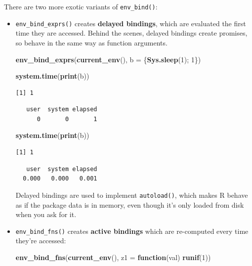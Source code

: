 \documentclass[]{book}
\newenvironment{Shaded}{\begin{snugshade}}{\end{snugshade}}
\newcommand{\ControlFlowTok}[1]{\textcolor[rgb]{0.13,0.29,0.53}{\textbf{#1}}}
\newcommand{\DataTypeTok}[1]{\textcolor[rgb]{0.13,0.29,0.53}{#1}}
\newcommand{\DecValTok}[1]{\textcolor[rgb]{0.00,0.00,0.81}{#1}}
\newcommand{\KeywordTok}[1]{\textcolor[rgb]{0.13,0.29,0.53}{\textbf{#1}}}
\newcommand{\NormalTok}[1]{#1}
\theoremstyle{definition}
\theoremstyle{definition}
\theoremstyle{definition}
\theoremstyle{remark}
\begin{document}
There are two more exotic variants of \texttt{env\_bind()}:

\begin{itemize}
\item
  \texttt{env\_bind\_exprs()} creates \textbf{delayed bindings}, which
  are evaluated the first time they are accessed. Behind the scenes,
  delayed bindings create promises, so behave in the same way as
  function arguments.

\begin{Shaded}
\begin{Highlighting}[]
\KeywordTok{env_bind_exprs}\NormalTok{(}\KeywordTok{current_env}\NormalTok{(), }\DataTypeTok{b =}\NormalTok{ \{}\KeywordTok{Sys.sleep}\NormalTok{(}\DecValTok{1}\NormalTok{); }\DecValTok{1}\NormalTok{\})}

\KeywordTok{system.time}\NormalTok{(}\KeywordTok{print}\NormalTok{(b))}
\end{Highlighting}
\end{Shaded}

\begin{verbatim}
[1] 1
\end{verbatim}

\begin{verbatim}
   user  system elapsed 
      0       0       1 
\end{verbatim}

\begin{Shaded}
\begin{Highlighting}[]
\KeywordTok{system.time}\NormalTok{(}\KeywordTok{print}\NormalTok{(b))}
\end{Highlighting}
\end{Shaded}

\begin{verbatim}
[1] 1
\end{verbatim}

\begin{verbatim}
   user  system elapsed 
  0.000   0.000   0.001 
\end{verbatim}

  Delayed bindings are used to implement \texttt{autoload()}, which
  makes R behave as if the package data is in memory, even though it's
  only loaded from disk when you ask for it.
\item
  \texttt{env\_bind\_fns()} creates \textbf{active bindings} which are
  re-computed every time they're accessed:

\begin{Shaded}
\begin{Highlighting}[]
\KeywordTok{env_bind_fns}\NormalTok{(}\KeywordTok{current_env}\NormalTok{(), }\DataTypeTok{z1 =} \ControlFlowTok{function}\NormalTok{(val) }\KeywordTok{runif}\NormalTok{(}\DecValTok{1}\NormalTok{))}


\end{Highlighting}
\end{Shaded}
\end{itemize}
\end{document}
